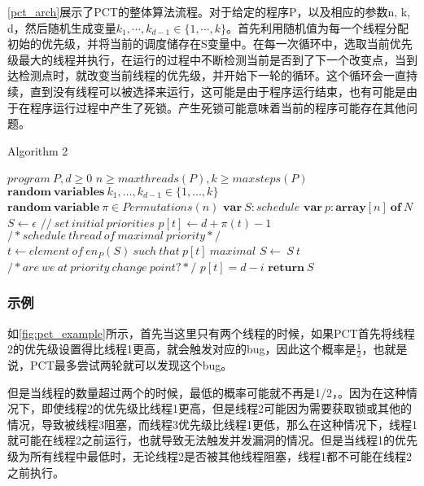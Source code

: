 \autoref{pct_arch}展示了PCT的整体算法流程。对于给定的程序P，以及相应的参数n, k, d，然后随机生成变量$k_1, \cdots, k_{d-1} \in \{1, \cdots, k\}$。首先利用随机值为每一个线程分配初始的优先级，并将当前的调度储存在S变量中。在每一次循环中，选取当前优先级最大的线程并执行，在运行的过程中不断检测当前是否到了下一个改变点，当到达检测点时，就改变当前线程的优先级，并开始下一轮的循环。这个循环会一直持续，直到没有线程可以被选择来运行，这可能是由于程序运行结束，也有可能是由于在程序运行过程中产生了死锁。产生死锁可能意味着当前的程序可能存在其他问题。

\begin{algorithm}[!ht]
\caption{Algorithm 2}
\label{pct_arch}
\begin{algorithmic}[1]
    \REQUIRE $program \ P,d \ge 0$
    \REQUIRE $n\ge maxthreads(P), k\ge maxsteps(P)$
    \REQUIRE $\mathbf{random\ variables}\ k_{1},…,k_{d-1}\in \{1,…,k\}$
    \REQUIRE $\mathbf{random\ variable}\ \pi\in Permutations(n)$
    \STATE $\mathbf{var}\ S:schedule$
    \STATE $\mathbf{var}\ p:\mathbf{array}[n]\ \mathbf{of}\ N$
    \STATE $S\leftarrow\epsilon $
    \STATE $//\ set\ initial\ priorities$
        \STATE $p[t]\leftarrow d+\pi (t)-1$
    \ENDFOR
        \STATE $/*schedule \ thread \ of \ maximal \ priority*/$
        \STATE $t\leftarrow element \ of \ en_{P}(S) \ such\ that \ p[t] \ maximal$
        \STATE $S\leftarrow \ S \ t$
        \STATE $/*are \ we \ at \ priority \ change \ point?*/$
                \STATE $p[t]=d-i$
            \ENDIF
        \ENDFOR
    \ENDWHILE
    \STATE $\mathbf{return} \ S$
\end{algorithmic}  
\end{algorithm}

\subsubsection{示例}

如\autoref{fig:pct_example}所示，首先当这里只有两个线程的时候，如果PCT首先将线程2的优先级设置得比线程1更高，就会触发对应的bug，因此这个概率是$\frac{1}{2}$，也就是说，PCT最多尝试两轮就可以发现这个bug。

但是当线程的数量超过两个的时候，最低的概率可能就不再是1/2，。因为在这种情况下，即使线程2的优先级比线程1更高，但是线程2可能因为需要获取锁或其他的情况，导致被线程3阻塞，而线程3优先级比线程1更低，那么在这种情况下，线程1就可能在线程2之前运行，也就导致无法触发并发漏洞的情况。但是当线程1的优先级为所有线程中最低时，无论线程2是否被其他线程阻塞，线程1都不可能在线程2之前执行。

